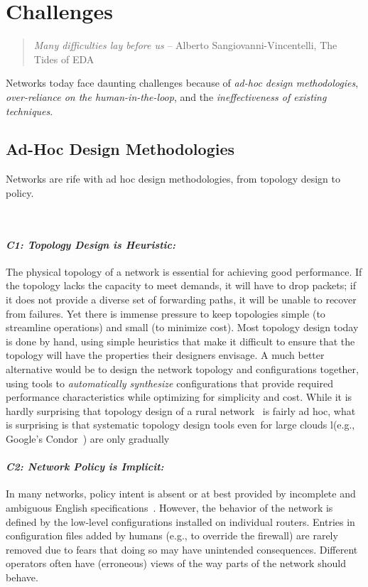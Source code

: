 \section{Challenges}
\label{sec:challenges}

\begin{quote}
{\em Many difficulties lay before us} -- Alberto
Sangiovanni-Vincentelli, The Tides of EDA~\cite{alberto}
\vspace{-2mm}
\end{quote}

Networks today face daunting challenges because of {\em ad-hoc design methodologies}, {\em over-reliance on the human-in-the-loop}, and the {\em ineffectiveness of existing techniques}.

\subsection{Ad-Hoc Design Methodologies}

Networks are rife with ad hoc design methodologies, from topology design to policy.

\
\paragraph*{\em C1: Topology Design is Heuristic:}
%
The physical topology of a network is essential for achieving good performance. If the topology lacks the capacity to meet demands, it will have to drop packets; if it does not provide a diverse set of forwarding paths, it will be unable to recover from failures.  Yet there is immense pressure to keep topologies simple (to streamline operations) and small (to minimize cost). Most topology design today is done by hand, using simple heuristics that make it difficult to ensure that the topology will have the properties their designers envisage. A much better alternative would be to design the network topology and configurations together, using tools to {\em automatically synthesize} configurations that provide required performance characteristics while optimizing for simplicity and cost. While it is 
hardly surprising that topology design of a rural network~\cite{barathwisp} is fairly ad hoc, what is
surprising is that systematic topology design tools even for large clouds l(e.g.,  Google's 
Condor~\cite{condor}) are only gradually 

\paragraph*{\em C2: Network Policy is Implicit:}
%
In many networks, policy intent is absent or at best provided by incomplete and ambiguous English specifications~\cite{propane}. However, the behavior of the network is defined by the low-level configurations installed on individual routers. Entries in configuration files added by humans (e.g., to override the firewall) are rarely removed due to fears that doing so may have unintended consequences. Different operators often have (erroneous) views of the way parts of the network should behave.

